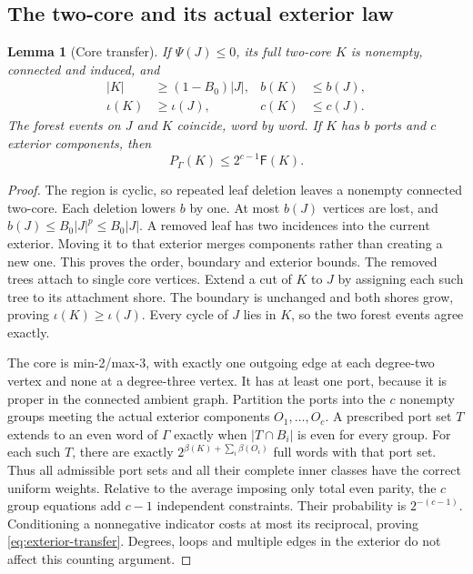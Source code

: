 \documentclass[11pt,a4paper]{article}
\numberwithin{equation}{section}
\newtheorem{lemma}[theorem]{Lemma}
\theoremstyle{definition}
\theoremstyle{remark}
\newcommand{\Fav}{\mathsf F}
\begin{document}
\subsection{The two-core and its actual exterior law}
\begin{lemma}[Core transfer]\label{lem:core-transfer}
If $\Psi(J)\le0$, its full two-core $K$ is nonempty, connected and induced, and
\begin{align}
 |K|&\ge(1-B_0)|J|,& b(K)&\le b(J),\nonumber\\
 \iota(K)&\ge\iota(J),&c(K)&\le c(J).\label{eq:core-transfer}
\end{align}
The forest events on $J$ and $K$ coincide, word by word. If $K$ has $b$ ports and $c$ exterior components, then
\begin{equation}\label{eq:exterior-transfer}
 P_\Gamma(K)\le2^{c-1}\Fav(K).
\end{equation}
\end{lemma}
\begin{proof}
The region is cyclic, so repeated leaf deletion leaves a nonempty connected two-core. Each deletion lowers $b$ by one. At most $b(J)$ vertices are lost, and $b(J)\le B_0|J|^p\le B_0|J|$. A removed leaf has two incidences into the current exterior. Moving it to that exterior merges components rather than creating a new one. This proves the order, boundary and exterior bounds. The removed trees attach to single core vertices. Extend a cut of $K$ to $J$ by assigning each such tree to its attachment shore. The boundary is unchanged and both shores grow, proving $\iota(K)\ge\iota(J)$. Every cycle of $J$ lies in $K$, so the two forest events agree exactly.

The core is min-2/max-3, with exactly one outgoing edge at each degree-two vertex and none at a degree-three vertex. It has at least one port, because it is proper in the connected ambient graph. Partition the ports into the $c$ nonempty groups meeting the actual exterior components $O_1,\ldots,O_c$. A prescribed port set $T$ extends to an even word of $\Gamma$ exactly when $|T\cap B_i|$ is even for every group. For each such $T$, there are exactly
$2^{\beta(K)+\sum_i\beta(O_i)}$ full words with that port set. Thus all admissible port sets and all their complete inner classes have the correct uniform weights. Relative to the average imposing only total even parity, the $c$ group equations add $c-1$ independent constraints. Their probability is $2^{-(c-1)}$. Conditioning a nonnegative indicator costs at most its reciprocal, proving \eqref{eq:exterior-transfer}. Degrees, loops and multiple edges in the exterior do not affect this counting argument.
\end{proof}
\end{document}
